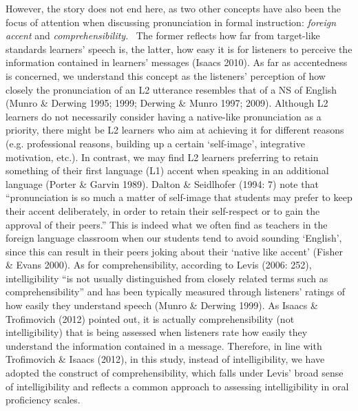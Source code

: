 \documentclass[12pt]{article}
\newenvironment{styleStandard}{\setlength\leftskip{0cm}\setlength\rightskip{0cm plus 1fil}\setlength\parindent{0cm}\setlength\parfillskip{0pt plus 1fil}\setlength\parskip{0in plus 1pt}\writerlistparindent\writerlistleftskip\leavevmode\normalfont\normalsize\writerlistlabel\ignorespaces}{\unskip\vspace{0.111in plus 0.0111in}\par}
\newcommand\writerlistleftskip{}
\newcommand\writerlistparindent{}
\newcommand\writerlistlabel{}
\begin{document}
\begin{styleStandard}
However, the story does not end here, as two other concepts have also been the focus of attention when discussing pronunciation in formal instruction: \textit{foreign accent} and \textit{comprehensibility}. \ The former reflects how far from target-like standards learners’ speech is, the latter, how easy it is for listeners to perceive the information contained in learners’ messages (Isaacs 2010). As far as accentedness is concerned, we understand this concept as the listeners’ perception of how closely the pronunciation of an L2 utterance resembles that of a NS of English (Munro \& Derwing 1995; 1999; Derwing \& Munro 1997; 2009). Although L2 learners do not necessarily consider having a native-like pronunciation as a priority, there might be L2 learners who aim at achieving it for different reasons (e.g. professional reasons, building up a certain ‘self-image’, integrative motivation, etc.). In contrast, we may find L2 learners preferring to retain something of their first language (L1) accent when speaking in an additional language (Porter \& Garvin 1989). Dalton \& Seidlhofer (1994: 7) note that “pronunciation is so much a matter of self-image that students may prefer to keep their accent deliberately, in order to retain their self-respect or to gain the approval of their peers.” This is indeed what we often find as teachers in the foreign language classroom when our students tend to avoid sounding ‘English’, since this can result in their peers joking about their ‘native like accent’ (Fisher \& Evans 2000). As for comprehensibility, according to Levis (2006: 252), intelligibility “is not usually distinguished from closely related terms such as comprehensibility” and has been typically measured through listeners’ ratings of how easily they understand speech (Munro \& Derwing 1999). As Isaacs \& Trofimovich (2012) pointed out, it is actually comprehensibility (not intelligibility) that is being assessed when listeners rate how easily they understand the information contained in a message. Therefore, in line with Trofimovich \& Isaacs (2012), in this study, instead of intelligibility, we have adopted the construct of comprehensibility, which falls under Levis’ broad sense of intelligibility and reflects a common approach to assessing intelligibility in oral proficiency scales.
\end{styleStandard}
\end{document}
